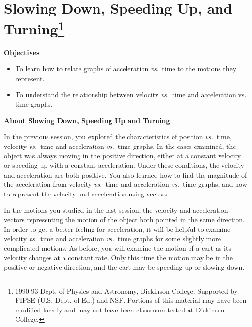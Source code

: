 
\section{Slowing Down, Speeding Up, and Turning\footnote{
1990-93 Dept. of Physics and Astronomy, Dickinson College. Supported by FIPSE
(U.S. Dept. of Ed.) and NSF. Portions of this material may have been modified
locally and may not have been classroom tested at Dickinson College.
}}


\makelabheader %

\medskip
\textbf{Objectives }

\begin{itemize}
\item To learn how to relate graphs of acceleration \textit{vs.}~time to the motions they represent. 
\item To understand the relationship between velocity \textit{vs.}~time and acceleration vs.
time graphs.
\end{itemize}

\medskip
\textbf{About Slowing Down, Speeding Up and Turning }

In the previous session, you explored the characteristics of position \textit{vs.}~time,
velocity \textit{vs.}~time and acceleration  \textit{vs.}~time graphs. In the cases examined, the object was always moving in the positive direction, either at a constant velocity or speeding up with a constant acceleration. Under these conditions, the velocity and acceleration are both positive. You also learned how to find the magnitude of the acceleration from velocity \textit{vs.}~time and acceleration \textit{vs.}~time graphs, and how to represent the velocity and acceleration using vectors. 

In the motions you studied in the last session, the velocity and acceleration
vectors representing the motion of the object both pointed in the same direction.
In order to get a better feeling for acceleration, it will be helpful to examine
velocity \textit{vs.}~time and acceleration \textit{vs.}~time graphs for some slightly more complicated motions. As before, you will examine the motion of a cart as its velocity changes at a constant rate. Only this time the motion may be in the positive or negative direction, and the cart may be speeding up or slowing down.

